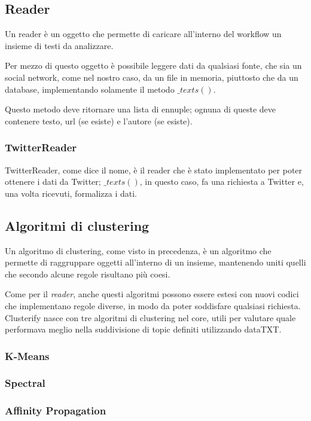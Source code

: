 	\subsection{Reader}
		Un reader è un oggetto che permette di caricare all'interno del workflow un insieme di testi da analizzare.

		Per mezzo di questo oggetto è possibile leggere dati da qualsiasi fonte, che sia un social network, come nel nostro caso, da un file in memoria, piuttosto che da un database, implementando solamente il metodo $\_texts()$.

		Questo metodo deve ritornare una lista di ennuple; ognuna di queste deve contenere testo, url (se esiste) e l'autore (se esiste).

		\subsubsection{TwitterReader}
			TwitterReader, come dice il nome, è il reader che è stato implementato per poter ottenere i dati da Twitter; $\_texts()$, in questo caso, fa una richiesta a Twitter e, una volta ricevuti, formalizza i dati.

	\subsection{Algoritmi di clustering}
		Un algoritmo di clustering, come visto in precedenza, è un algoritmo che permette di raggruppare oggetti all'interno di un insieme, mantenendo uniti quelli che secondo alcune regole risultano più coesi.

		Come per il \emph{reader}, anche questi algoritmi possono essere estesi con nuovi codici che implementano regole diverse, in modo da poter soddisfare qualsiasi richiesta. Clusterify nasce con tre algoritmi di clustering nel core, utili per valutare quale performava meglio nella suddivisione di topic definiti utilizzando dataTXT.

		\subsubsection{K-Means}
			

		\subsubsection{Spectral}
			

		\subsubsection{Affinity Propagation}
			
		
